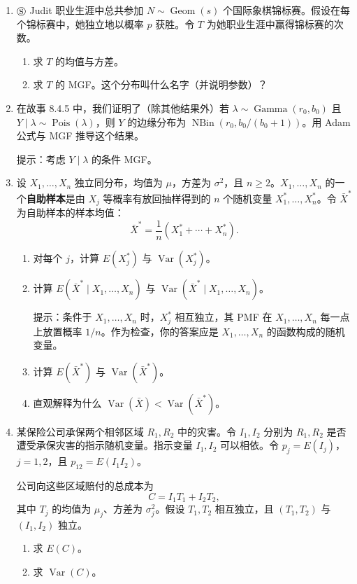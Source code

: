\documentclass[UTF8, 12pt, fontset=fandol, oneside]{ctexart}
\begin{document}
\begin{enumerate}
  \item $\circledS$ Judit 职业生涯中总共参加 $N\sim\operatorname{Geom}(s)$ 个国际象棋锦标赛。假设在每个锦标赛中，她独立地以概率 $p$ 获胜。令 $T$ 为她职业生涯中赢得锦标赛的次数。
  \begin{enumerate}
    \item[(a)] 求 $T$ 的均值与方差。
    \item[(b)] 求 $T$ 的 MGF。这个分布叫什么名字（并说明参数）？
  \end{enumerate}

  \item 在故事 8.4.5 中，我们证明了（除其他结果外）若 $\lambda\sim\operatorname{Gamma}(r_0,b_0)$ 且 $Y\mid\lambda\sim\operatorname{Pois}(\lambda)$，则 $Y$ 的边缘分布为 $\operatorname{NBin}(r_0,b_0/(b_0+1))$。用 Adam 公式与 MGF 推导这个结果。

  \noindent 提示：考虑 $Y\mid\lambda$ 的条件 MGF。

  \item 设 $X_1,\ldots,X_n$ 独立同分布，均值为 $\mu$，方差为 $\sigma^2$，且 $n\ge2$。$X_1,\ldots,X_n$ 的一个\textbf{自助样本}是由 $X_j$ 等概率有放回抽样得到的 $n$ 个随机变量 $X_1^*,\ldots,X_n^*$。令 $\bar X^*$ 为自助样本的样本均值：
  \[
    \bar X^*=\frac1n(X_1^*+\cdots+X_n^*).
  \]
  \begin{enumerate}
    \item[(a)] 对每个 $j$，计算 $E(X_j^*)$ 与 $\operatorname{Var}(X_j^*)$。
    \item[(b)] 计算 $E(\bar X^*\mid X_1,\ldots,X_n)$ 与 $\operatorname{Var}(\bar X^*\mid X_1,\ldots,X_n)$。

    \noindent 提示：条件于 $X_1,\ldots,X_n$ 时，$X_j^*$ 相互独立，其 PMF 在 $X_1,\ldots,X_n$ 每一点上放置概率 $1/n$。作为检查，你的答案应是 $X_1,\ldots,X_n$ 的函数构成的随机变量。

    \item[(c)] 计算 $E(\bar X^*)$ 与 $\operatorname{Var}(\bar X^*)$。
    \item[(d)] 直观解释为什么 $\operatorname{Var}(\bar X)<\operatorname{Var}(\bar X^*)$。
  \end{enumerate}

  \item 某保险公司承保两个相邻区域 $R_1,R_2$ 中的灾害。令 $I_1,I_2$ 分别为 $R_1,R_2$ 是否遭受承保灾害的指示随机变量。指示变量 $I_1,I_2$ 可以相依。令 $p_j=E(I_j)$，$j=1,2$，且 $p_{12}=E(I_1I_2)$。

  公司向这些区域赔付的总成本为
  \[
    C=I_1T_1+I_2T_2,
  \]
  其中 $T_j$ 的均值为 $\mu_j$、方差为 $\sigma_j^2$。假设 $T_1,T_2$ 相互独立，且 $(T_1,T_2)$ 与 $(I_1,I_2)$ 独立。
  \begin{enumerate}
    \item[(a)] 求 $E(C)$。
    \item[(b)] 求 $\operatorname{Var}(C)$。
  \end{enumerate}


\end{enumerate}
\end{document}
